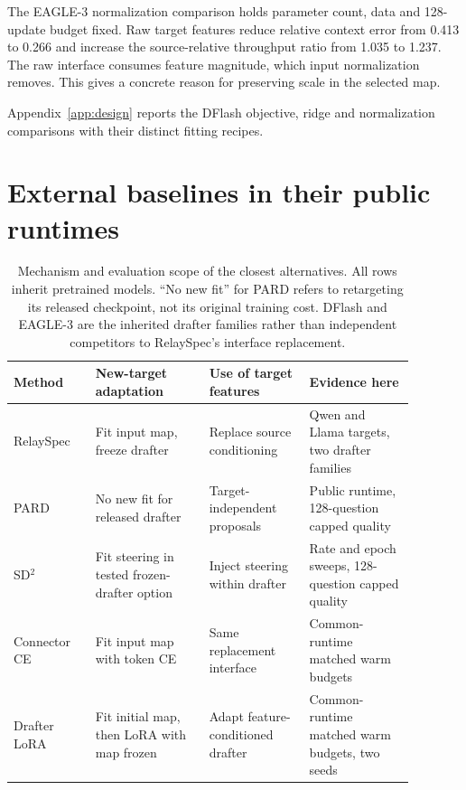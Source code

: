 \documentclass{article}
\begin{document}
The EAGLE-3 normalization comparison holds parameter count, data and
128-update budget fixed. Raw target features reduce relative context
error from 0.413 to 0.266 and increase the source-relative throughput
ratio from 1.035 to 1.237. The raw interface consumes feature magnitude,
which input normalization removes. This gives a concrete reason for
preserving scale in the selected map.

Appendix~\ref{app:design} reports the DFlash objective, ridge and
normalization comparisons with their distinct fitting recipes.

\section{External baselines in their public runtimes}
\label{app:externalbaselines}


\begin{table}[H]
\caption{Mechanism and evaluation scope of the closest alternatives.
All rows inherit pretrained models. ``No new fit'' for PARD refers to
retargeting its released checkpoint, not its original training cost.
DFlash and EAGLE-3 are the inherited drafter families rather than
independent competitors to RelaySpec's interface replacement.}
\label{tab:method-differences}
\centering\footnotesize
\begin{tabular}{p{0.18\linewidth}p{0.25\linewidth}p{0.22\linewidth}p{0.23\linewidth}}
\toprule
Method & New-target adaptation & Use of target features & Evidence here \\
\midrule
RelaySpec & Fit input map, freeze drafter & Replace source conditioning & Qwen and Llama targets, two drafter families \\
PARD \citep{an2026pard} & No new fit for released drafter & Target-independent proposals & Public runtime, 128-question capped quality \\
SD$^2$ \citep{berdoz2026sd2} & Fit steering in tested frozen-drafter option & Inject steering within drafter & Rate and epoch sweeps, 128-question capped quality \\
Connector CE & Fit input map with token CE & Same replacement interface & Common-runtime matched warm budgets \\
Drafter LoRA & Fit initial map, then LoRA with map frozen & Adapt feature-conditioned drafter & Common-runtime matched warm budgets, two seeds \\
\bottomrule
\end{tabular}
\end{table}
\end{document}
